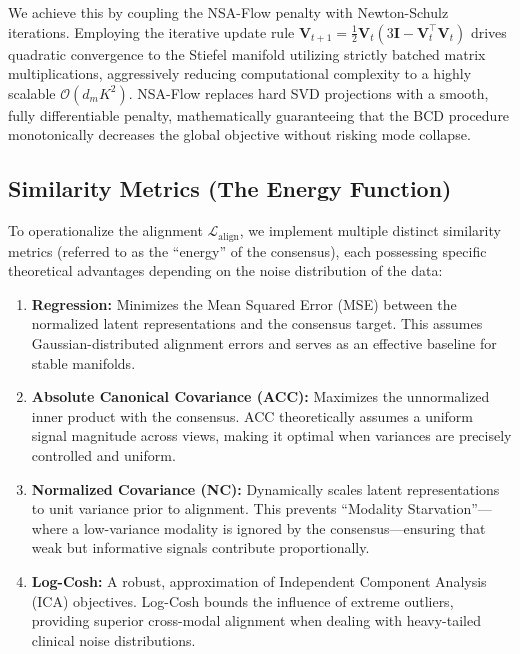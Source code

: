 \documentclass[
  letterpaper,
]{report}
\providecommand{\tightlist}{%
  \setlength{\itemsep}{0pt}\setlength{\parskip}{0pt}}
\begin{document}
We achieve this by coupling the NSA-Flow penalty with Newton-Schulz
iterations. Employing the iterative update rule
\(\mathbf{V}_{t+1} = \frac{1}{2} \mathbf{V}_t (3\mathbf{I} - \mathbf{V}_t^\top \mathbf{V}_t)\)
drives quadratic convergence to the Stiefel manifold utilizing strictly
batched matrix multiplications, aggressively reducing computational
complexity to a highly scalable \(\mathcal{O}(d_m K^2)\). NSA-Flow
replaces hard SVD projections with a smooth, fully differentiable
penalty, mathematically guaranteeing that the BCD procedure
monotonically decreases the global objective without risking mode
collapse.

\subsection{Similarity Metrics (The Energy
Function)}\label{similarity-metrics-the-energy-function}

To operationalize the alignment \(\mathcal{L}_{\text{align}}\), we
implement multiple distinct similarity metrics (referred to as the
``energy'' of the consensus), each possessing specific theoretical
advantages depending on the noise distribution of the data:

\begin{enumerate}
\def\labelenumi{\arabic{enumi}.}
\tightlist
\item
  \textbf{Regression:} Minimizes the Mean Squared Error (MSE) between
  the normalized latent representations and the consensus target. This
  assumes Gaussian-distributed alignment errors and serves as an
  effective baseline for stable manifolds.
\item
  \textbf{Absolute Canonical Covariance (ACC):} Maximizes the
  unnormalized inner product with the consensus. ACC theoretically
  assumes a uniform signal magnitude across views, making it optimal
  when variances are precisely controlled and uniform.
\item
  \textbf{Normalized Covariance (NC):} Dynamically scales latent
  representations to unit variance prior to alignment. This prevents
  ``Modality Starvation''---where a low-variance modality is ignored by
  the consensus---ensuring that weak but informative signals contribute
  proportionally.
\item
  \textbf{Log-Cosh:} A robust, approximation of Independent Component
  Analysis (ICA) objectives. Log-Cosh bounds the influence of extreme
  outliers, providing superior cross-modal alignment when dealing with
  heavy-tailed clinical noise distributions.
\end{enumerate}
\end{document}
